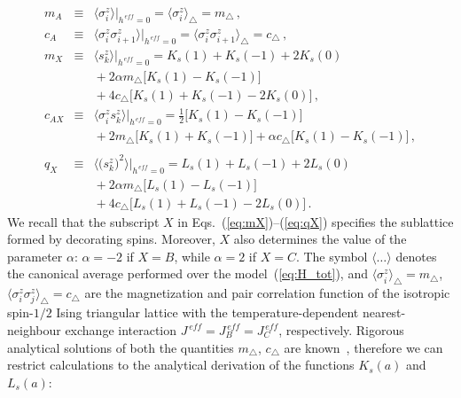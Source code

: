 \documentclass[final,5p,times,sort&compress]{elsarticle}
\begin{document}
\begin{eqnarray}
\label{eq:mA}
m_{A} \!\!\!&\equiv&\!\!\! \big\langle\sigma_i^z\big\rangle\big|_{h^{\,e\!f\!f} = 0} = \big\langle\sigma_i^z\big\rangle_{\triangle} = m_{\triangle} \,,
\\
\label{eq:cA}
c_{A} \!\!\!&\equiv&\!\!\! \big\langle\sigma_i^z\sigma_{i+1}^z\big\rangle\big|_{h^{\,e\!f\!f} = 0} = \big\langle\sigma_i^z\sigma_{i+1}^z\big\rangle_{\triangle} = c_{\triangle} \,,
\\
\label{eq:mX}
m_{X} \!\!\!&\equiv&\!\!\! \big\langle s_{k}^z\big\rangle\big|_{h^{\,e\!f\!f} = 0}
= K_s(1) + K_s(-1) + 2K_s(0)
{}
\nonumber\\
&& {}
+ 2\alpha m_{\triangle}\big[K_s(1) - K_s(-1)\big] {}
\nonumber\\
&& {}+ 4c_{\triangle}\big[K_s(1)+K_s(-1)-2K_s(0)\big]\,,
\\
\label{eq:cX}
c_{AX} \!\!\!&\equiv&\!\!\! \big\langle \sigma_i^zs_{k}^z\big\rangle\big|_{h^{\,e\!f\!f} = 0} =
\frac{1}{2}\big[K_s(1)-K_s(-1)\big]
{}
\nonumber\\
&& {}
+
2m_{\triangle}\big[K_s(1) + K_s(-1)\big]
+\alpha c_{\triangle}\big[K_s(1)-K_s(-1)\big]\,,
\nonumber\\
\\
\label{eq:qX}
q_{X} \!\!\!&\equiv&\!\!\! \Big\langle \big(s_{k}^z\big)^2\Big\rangle\big|_{h^{\,e\!f\!f} = 0}
= L_s(1) + L_s(-1) + 2L_s(0)
{}
\nonumber\\
&& {}
+ 2\alpha m_{\triangle}\big[L_s(1) - L_s(-1)\big] {}
{}
\nonumber\\
&& {} +4c_{\triangle}\big[L_s(1)+L_s(-1)-2L_s(0)\big]\,.
\end{eqnarray}
We recall that the subscript $X$ in Eqs.~(\ref{eq:mX})--(\ref{eq:qX}) specifies the sublattice formed by decorating spins. Moreover, $X$ also determines the value of the parameter $\alpha$: $\alpha = -2$ if $X=B$, while $\alpha = 2$ if $X=C$. The symbol $\langle\ldots\rangle$ denotes the canonical average performed over the model~(\ref{eq:H_tot}), and $\langle\sigma_i^z\big\rangle_{\triangle} = m_{\triangle}$, $\langle\sigma_i^z\sigma_{j}^z\big\rangle_{\triangle} = c_{\triangle}$ are the magnetization and pair correlation function of the isotropic spin-$1/2$ Ising triangular lattice with the temperature-dependent nearest-neighbour exchange interaction $J^{\,e\!f\!f} = J_{\!B}^{\,e\!f\!f} = J_{\!C}^{\,e\!f\!f}$, respectively. Rigorous analytical solutions of both the quantities $m_{\triangle}$, $c_{\triangle}$ are known~\cite{Pot52, Dom60}, therefore we can restrict calculations to the analytical derivation of the functions $K_s(a)$ and $L_s(a)$:
\end{document}
